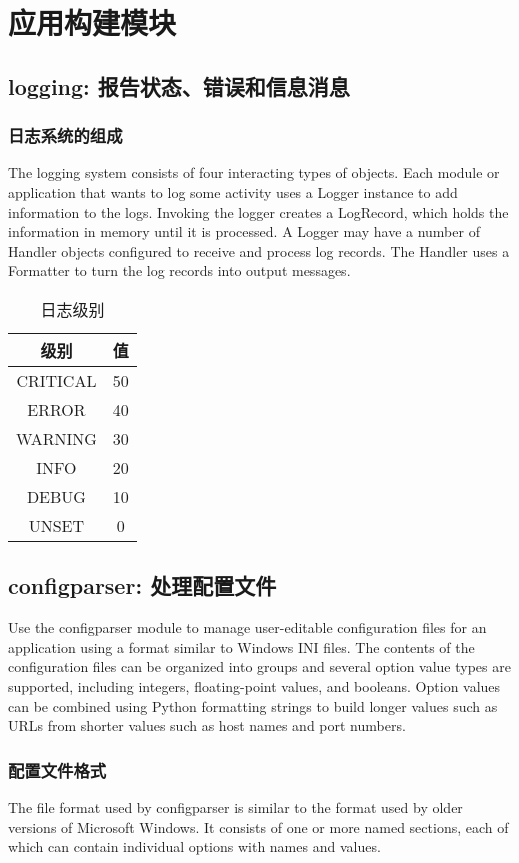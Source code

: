 \chapter{应用构建模块\label{ch14}}
\section{logging: 报告状态、错误和信息消息}
\subsection{日志系统的组成}
The logging system consists of four interacting types of objects. Each module or application that wants to log some activity uses a Logger instance to add information to the logs. Invoking the logger creates a LogRecord, which holds the information in memory until it is processed. A Logger may have a number of Handler objects configured to receive and process log records. The Handler uses a Formatter to turn the log records into output messages.

\begin{table}
    \centering
    \caption{日志级别}
    \label{loggingLevel}
    \begin{tabular}{cc}
        \hline
        级别       & 值  \\
        \hline
        CRITICAL & 50 \\
        ERROR    & 40 \\
        WARNING  & 30 \\
        INFO     & 20 \\
        DEBUG    & 10 \\
        UNSET    & 0  \\
        \hline
    \end{tabular}
\end{table}
\section{configparser: 处理配置文件}
Use the configparser module to manage user-editable configuration files for an application using a format similar to Windows INI files. The contents of the configuration files can be organized into groups and several option value types are supported, including integers, floating-point values, and booleans. Option values can be combined using Python formatting strings to build longer values such as URLs from shorter values such as host names and port numbers.
\subsection{配置文件格式}
The file format used by configparser is similar to the format used by older versions of Microsoft Windows. It consists of one or more named sections, each of which can contain individual options with names and values.

